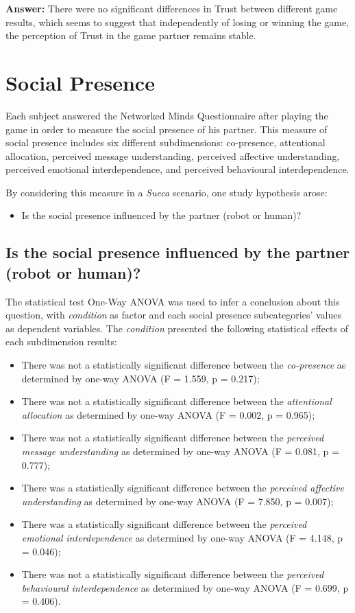 \textbf{Answer:} There were no significant differences in Trust between different game results, which seems to suggest that independently of losing or winning the game, the perception of Trust in the game partner remains stable.


\section{Social Presence}
\label{sec:socialPresence}
Each subject answered the Networked Minds Questionnaire after playing the game in order to measure the social presence of his partner.
This measure of social presence includes six different subdimensions: co-presence, attentional allocation, perceived message understanding, perceived affective understanding, perceived emotional interdependence, and perceived behavioural interdependence.

By considering this measure in a \emph{Sueca} scenario, one study hypothesis arose:
\begin{itemize}
\item Is the social presence influenced by the partner (robot or human)?
\end{itemize}

\subsection*{Is the social presence influenced by the partner (robot or human)?}
The statistical test One-Way ANOVA was used to infer a conclusion about this question, with \emph{condition} as factor and each social presence subcategories' values as dependent variables.
The \emph{condition} presented the following statistical effects of each subdimension results:
\begin{itemize}
\item There was not a statistically significant difference between the \emph{co-presence} as determined by one-way ANOVA (F = 1.559, p = 0.217);
\item There was not a statistically significant difference between the \emph{attentional allocation} as determined by one-way ANOVA (F = 0.002, p = 0.965);
\item There was not a statistically significant difference between the \emph{perceived message understanding} as determined by one-way ANOVA (F = 0.081, p = 0.777);
\item There was a statistically significant difference between the \emph{perceived affective understanding} as determined by one-way ANOVA (F = 7.850, p = 0.007);
\item There was a statistically significant difference between the \emph{perceived emotional interdependence} as determined by one-way ANOVA (F = 4.148, p = 0.046);
\item There was not a statistically significant difference between the \emph{perceived behavioural interdependence} as determined by one-way ANOVA (F = 0.699, p = 0.406).
\end{itemize}

